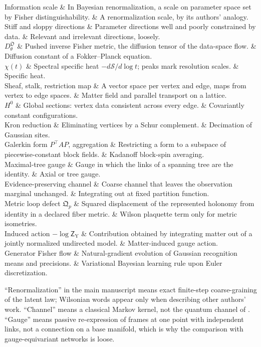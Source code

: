 \begin{decoder}
Information scale & In Bayesian renormalization, a scale on parameter space set by Fisher distinguishability. & A renormalization scale, by its authors' analogy. \\
Stiff and sloppy directions & Parameter directions well and poorly constrained by data. & Relevant and irrelevant directions, loosely. \\
$D^{\mathfrak O}_\theta$ & Pushed inverse Fisher metric, the diffusion tensor of the data-space flow. & Diffusion constant of a Fokker--Planck equation. \\
$\chi(t)$ & Spectral specific heat $-d\mathcal S/d\log t$; peaks mark resolution scales. & Specific heat. \\
Sheaf, stalk, restriction map & A vector space per vertex and edge, maps from vertex to edge spaces. & Matter field and parallel transport on a lattice. \\
$H^0$ & Global sections: vertex data consistent across every edge. & Covariantly constant configurations. \\
Kron reduction & Eliminating vertices by a Schur complement. & Decimation of Gaussian sites. \\
Galerkin form $P^\top AP$, aggregation & Restricting a form to a subspace of piecewise-constant block fields. & Kadanoff block-spin averaging. \\
Maximal-tree gauge & Gauge in which the links of a spanning tree are the identity. & Axial or tree gauge. \\
Evidence-preserving channel & Coarse channel that leaves the observation marginal unchanged. & Integrating out at fixed partition function. \\
Metric loop defect $\mathfrak Q_p$ & Squared displacement of the represented holonomy from identity in a declared fiber metric. & Wilson plaquette term only for metric isometries. \\
Induced action $-\log\mathsf Z_{\mathrm Y}$ & Contribution obtained by integrating matter out of a jointly normalized undirected model. & Matter-induced gauge action. \\
Generator Fisher flow & Natural-gradient evolution of Gaussian recognition means and precisions. & Variational Bayesian learning rule upon Euler discretization. \\
\end{decoder}

``Renormalization'' in the main manuscript means exact finite-step coarse-graining of the latent law;
Wilsonian words appear only when describing other authors' work. ``Channel'' means a classical Markov
kernel, not the quantum channel of \citet{beny2015information}. ``Gauge'' means passive re-expression of
frames at one point with independent links, not a connection on a base manifold, which is why the
comparison with gauge-equivariant networks \citep{cohen2019gauge} is loose.

